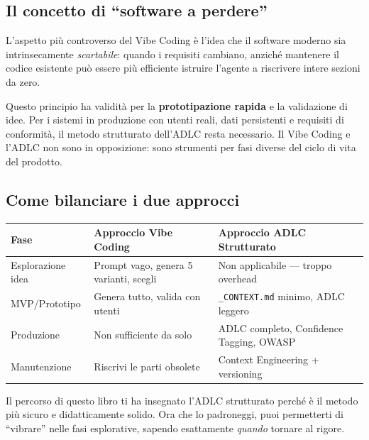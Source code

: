 \subsection{Il concetto di ``software a perdere''}

L'aspetto più controverso del Vibe Coding è l'idea che il software moderno sia intrinsecamente \textit{scartabile}: quando i requisiti cambiano, anziché mantenere il codice esistente può essere più efficiente istruire l'agente a riscrivere intere sezioni da zero.

\begin{notebox}
Questo principio ha validità per la \textbf{prototipazione rapida} e la validazione di idee. Per i sistemi in produzione con utenti reali, dati persistenti e requisiti di conformità, il metodo strutturato dell'ADLC resta necessario. Il Vibe Coding e l'ADLC non sono in opposizione: sono strumenti per fasi diverse del ciclo di vita del prodotto.
\end{notebox}

\subsection{Come bilanciare i due approcci}

\begin{center}
\begin{small}
\begin{tabularx}{\textwidth}{l X X}
\toprule
\textbf{Fase} & \textbf{Approccio Vibe Coding} & \textbf{Approccio ADLC Strutturato} \\
\midrule
Esplorazione idea & Prompt vago, genera 5 varianti, scegli & Non applicabile --- troppo overhead \\
MVP/Prototipo & Genera tutto, valida con utenti & \texttt{\_CONTEXT.md} minimo, ADLC leggero \\
Produzione & Non sufficiente da solo & ADLC completo, Confidence Tagging, OWASP \\
Manutenzione & Riscrivi le parti obsolete & Context Engineering + versioning \\
\bottomrule
\end{tabularx}
\end{small}
\end{center}

\begin{tipbox}
Il percorso di questo libro ti ha insegnato l'ADLC strutturato perché è il metodo più sicuro e didatticamente solido. Ora che lo padroneggi, puoi permetterti di ``vibrare'' nelle fasi esplorative, sapendo esattamente \textit{quando} tornare al rigore.
\end{tipbox}

